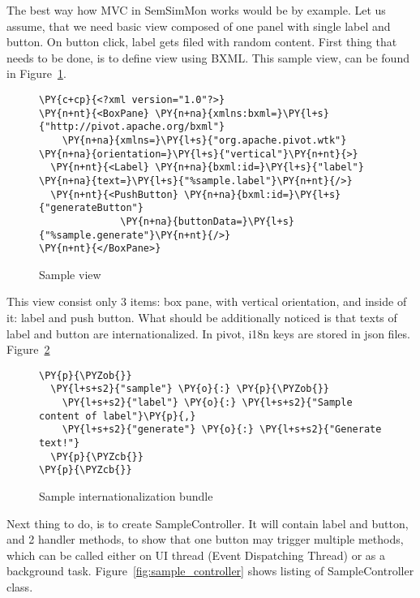 The best way how MVC in SemSimMon works would be by example. Let us assume, that we need basic view composed of one
panel with single label and button. On button click, label gets filed with random content. First thing that needs to be
done, is to define view using BXML. This sample view, can be found in Figure~\ref{fig:sample_view}.

\begin{figure}[ht]
  \centering
    
\begin{Verbatim}[commandchars=\\\{\},frame=single,framerule=0.2pt]                                                    
\PY{c+cp}{<?xml version="1.0"?>}
\PY{n+nt}{<BoxPane} \PY{n+na}{xmlns:bxml=}\PY{l+s}{"http://pivot.apache.org/bxml"}
    \PY{n+na}{xmlns=}\PY{l+s}{"org.apache.pivot.wtk"} \PY{n+na}{orientation=}\PY{l+s}{"vertical"}\PY{n+nt}{>}
  \PY{n+nt}{<Label} \PY{n+na}{bxml:id=}\PY{l+s}{"label"} \PY{n+na}{text=}\PY{l+s}{"%sample.label"}\PY{n+nt}{/>}
  \PY{n+nt}{<PushButton} \PY{n+na}{bxml:id=}\PY{l+s}{"generateButton"}
              \PY{n+na}{buttonData=}\PY{l+s}{"%sample.generate"}\PY{n+nt}{/>}
\PY{n+nt}{</BoxPane>}
\end{Verbatim} 
  \caption{Sample view}
  \label{fig:sample_view}
\end{figure}

This view consist only 3 items: box pane, with vertical orientation, and inside of it: label and push button. What
should be additionally noticed is that texts of label and button are internationalized. In pivot, i18n keys are stored
in json files. Figure~\ref{fig:i18n} 

\begin{figure}[ht]
  \centering
    
\begin{Verbatim}[commandchars=\\\{\},frame=single,framerule=0.2pt]                                                    
\PY{p}{\PYZob{}}
  \PY{l+s+s2}{"sample"} \PY{o}{:} \PY{p}{\PYZob{}}
    \PY{l+s+s2}{"label"} \PY{o}{:} \PY{l+s+s2}{"Sample content of label"}\PY{p}{,}
    \PY{l+s+s2}{"generate"} \PY{o}{:} \PY{l+s+s2}{"Generate text!"}
  \PY{p}{\PYZcb{}}
\PY{p}{\PYZcb{}}
\end{Verbatim} 
  \caption{Sample internationalization bundle}
  \label{fig:i18n}
\end{figure}

Next thing to do, is to create SampleController. It will contain label and button, and 2 handler methods, to show that
one button may trigger multiple methods, which can be called either on UI thread (Event Dispatching Thread) or as a
background task. Figure~\ref{fig:sample_controller} shows listing of SampleController class. 

